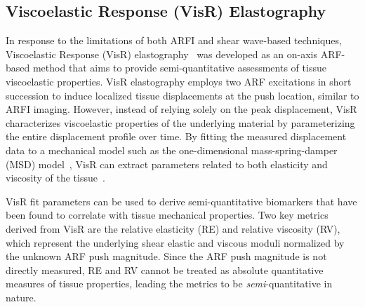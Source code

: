 \subsection{Viscoelastic Response (VisR) Elastography}


In response to the limitations of both ARFI and shear wave-based techniques, Viscoelastic Response (VisR) elastography~\cite{selzo_Viscoelastic_2013} was developed as an on-axis ARF-based method that aims to provide semi-quantitative assessments of tissue viscoelastic properties. VisR elastography employs two ARF excitations in short succession to induce localized tissue displacements at the push location, similar to ARFI imaging. However, instead of relying solely on the peak displacement, VisR characterizes viscoelastic properties of the underlying material by parameterizing the entire displacement profile over time. By fitting the measured displacement data to a mechanical model such as the one-dimensional mass-spring-damper (MSD) model~\cite{selzo_Quantitative_2016}, VisR can extract parameters related to both elasticity and viscosity of the tissue~\cite{hossain_Viscoelastic_2020}.


VisR fit parameters can be used to derive semi-quantitative biomarkers that have been found to correlate with tissue mechanical properties. Two key metrics derived from VisR are the relative elasticity (RE) and relative viscosity (RV), which represent the underlying shear elastic and viscous moduli normalized by the unknown ARF push magnitude. Since the ARF push magnitude is not directly measured, RE and RV cannot be treated as absolute quantitative measures of tissue properties, leading the metrics to be \emph{semi}-quantitative in nature.

